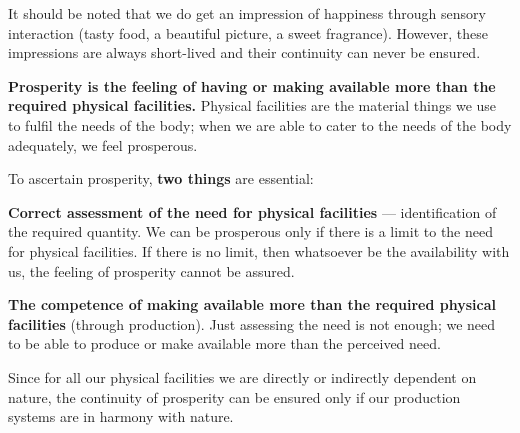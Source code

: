 It should be noted that we do get an impression of happiness through sensory
interaction (tasty food, a beautiful picture, a sweet fragrance). However,
these impressions are always short-lived and their continuity can never be
ensured.


\ans \textbf{Prosperity is the feeling of having or making available more than
the required physical facilities.} Physical facilities are the material things
we use to fulfil the needs of the body; when we are able to cater to the needs
of the body adequately, we feel prosperous.

To ascertain prosperity, \textbf{two things} are essential:

\begin{apts}
\item \textbf{Correct assessment of the need for physical facilities} ---
      identification of the required quantity. We can be prosperous only if
      there is a limit to the need for physical facilities. If there is no
      limit, then whatsoever be the availability with us, the feeling of
      prosperity cannot be assured.
\item \textbf{The competence of making available more than the required
      physical facilities} (through production). Just assessing the need is
      not enough; we need to be able to produce or make available more than
      the perceived need.
\end{apts}

Since for all our physical facilities we are directly or indirectly dependent
on nature, the continuity of prosperity can be ensured only if our production
systems are in harmony with nature.


